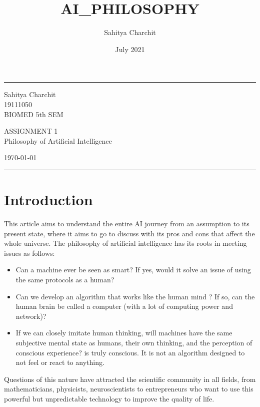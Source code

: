 \documentclass{article}
\title{AI_PHILOSOPHY}
\author{Sahitya Charchit }
\date{July 2021}
\begin{document}
    
    \fancyhead{}
    \hrule \medskip %
    \begin{minipage}{0.295\textwidth} 
    \raggedright
    \footnotesize
    Sahitya Charchit\hfill\\   
    19111050\hfill\\
    BIOMED 5th SEM
    \end{minipage}
    \begin{minipage}{0.4\textwidth} 
    \centering 
    \large 
    ASSIGNMENT 1\\
    \normalsize 
    Philosophy of Artificial Intelligence\\ 
    \end{minipage}
    \begin{minipage}{0.295\textwidth} 
    \raggedleft
    \today\hfill\\
    \end{minipage}
    \medskip\hrule 
    \bigskip

\section{Introduction}
This article aims to understand the entire AI journey from an assumption to its present state, where it aims to go to discuss with its pros and cons that affect the whole universe. The philosophy of artificial intelligence has its roots in meeting issues as follows:
\begin{itemize}
\item Can a machine ever be seen as smart? If yes, would it solve an issue of using the same protocols as a human?
\item Can we develop an algorithm that works like the human mind ? If so, can the human brain be called a  computer (with a lot of computing power and network)?
\item If we can closely imitate human thinking, will machines have the same subjective mental state as humans, their own thinking, and the perception of conscious experience?  is truly conscious. It is not an algorithm designed to not feel or react to anything.
\end{itemize}
Questions of this nature have attracted the scientific community in all fields, from mathematicians, physicists, neuroscientists to entrepreneurs who want to use this powerful but unpredictable  technology to improve the quality of life.
\end{document}
